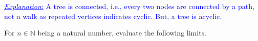 \documentclass[addpoints,12pt]{exam}
\newcommand{\mycorrectchoice}[1]{\CorrectChoice \fbox{#1}}
\newcommand{\mycorrectchoice}[1]{\CorrectChoice #1}
\newcommand{\Exp}[1]{\textcolor{blue}{\underline{\emph{Explanation}:} #1}}
\begin{document}
{\begin{questions}
\begin{parts}
\begin{solution}
                    \Exp{A tree is connected, i.e., every two nodes are connected by a path, not a walk as repeated vertices indicates cyclic. But, a tree is acyclic.}
                \end{solution}
         \end{parts}

     \vspace{20pt}

    \newpage


    \question For $n \in \mathbb{N}$ being a natural number, evaluate the following limits.
    	 \vspace{10pt}
\end{questions}}
\end{document}
